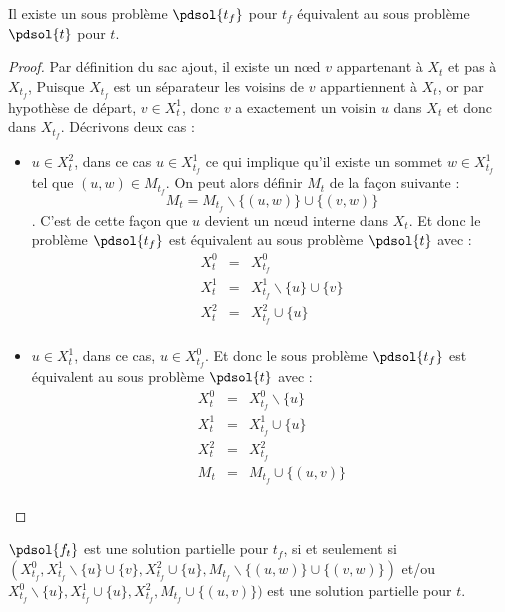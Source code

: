 \begin{nlemma}
    Il existe un sous problème $\pdsol{t_f}$ pour $t_f$ équivalent au sous problème $\pdsol{t}$ pour
    $t$.
\end{nlemma}

\begin{proof}
    Par définition du sac ajout, il existe un n\oe d $v$ appartenant à $X_t$ et pas à $X_{t_f}$,
    Puisque $X_{t_f}$ est un séparateur les voisins de $v$ appartiennent à $X_t$, or par hypothèse
    de départ, $v \in X_t^1$, donc $v$ a exactement un voisin $u$ dans $X_t$ et donc dans $X_{t_f}$.
    Décrivons deux cas :
    \begin{itemize}
        \item $u \in X_t^2$, dans ce cas $u \in X_{t_f}^1$ ce qui implique qu'il existe un sommet $w
            \in X_{t_f}^1$ tel que $(u,w) \in M_{t_f}$. On peut alors définir $M_t$ de la façon
            suivante : \[
                M_t = M_{t_f} \backslash \{(u,w)\} \cup \{(v,w)\}
            \]. C'est de cette façon que $u$ devient un n\oe ud interne dans $X_t$. Et donc le
            problème $\pdsol{t_f}$ est équivalent au sous problème $\pdsol{t}$ avec :
            \[
                \begin{array}{rcl}
                    X_t^0 & = & X_{t_f}^0 \\
                    X_t^1 & = & X_{t_f}^1 \backslash \{u\} \cup \{v\}\\
                    X_t^2 & = & X_{t_f}^2 \cup \{u\}\\
                \end{array}
            \]
        \item $u \in X_t^1$, dans ce cas, $u \in X_{t_f}^0$. Et donc le sous problème $\pdsol{t_f}$
            est équivalent au sous problème $\pdsol{t}$ avec :
            \[
                \begin{array}{rcl}
                    X_t^0 & = & X_{t_f}^0 \backslash \{u\} \\
                    X_t^1 & = & X_{t_f}^1 \cup \{u\}\\
                    X_t^2 & = & X_{t_f}^2\\
                    M_t & = & M_{t_f} \cup \{(u, v)\}\\
                \end{array}
            \]
    \end{itemize}
\end{proof}

\begin{ncorol}
    $\pdsol{f_t}$ est une solution partielle pour $t_f$, si et seulement si $(X_{t_f}^0, X_{t_f}^1
    \backslash \{u\} \cup \{v\},X_{t_f}^2 \cup \{u\},M_{t_f} \backslash \{(u,w)\} \cup \{(v,w)\})$
    et/ou $X_{t_f}^0 \backslash \{u\}, X_{t_f}^1 \cup \{u\}, X_{t_f}^2, M_{t_f} \cup \{(u, v)\})$ est
    une solution partielle pour $t$.
\end{ncorol}

